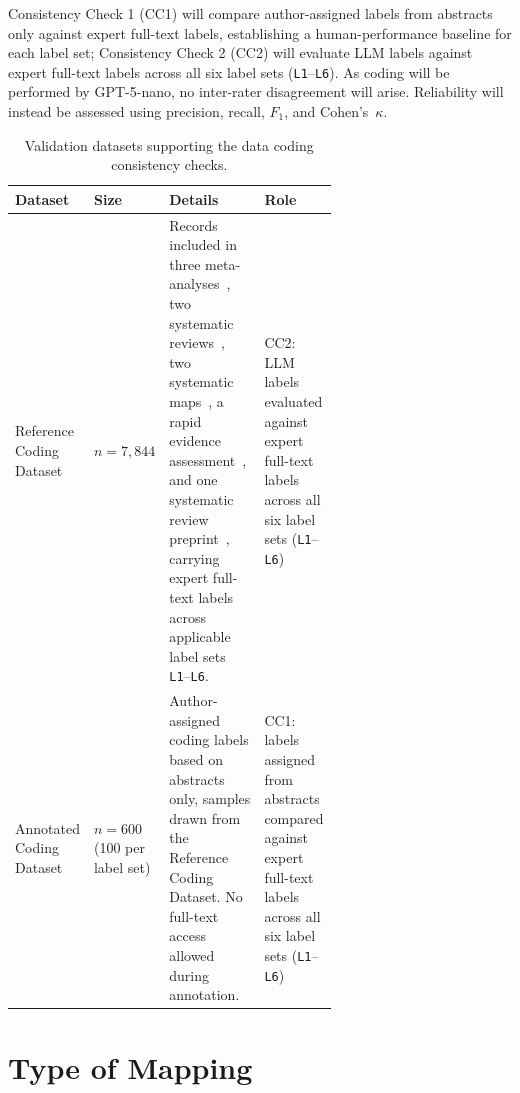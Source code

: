 \documentclass[12pt]{article}
\renewcommand{\arraystretch}{1.2}
\begin{document}
Consistency Check 1 (CC1) will compare author-assigned labels from abstracts only against expert full-text labels, establishing a human-performance baseline for each label set; Consistency Check 2 (CC2) will evaluate LLM labels against expert full-text labels across all six label sets (\texttt{L1}--\texttt{L6}). As coding will be performed by GPT-5-nano, no inter-rater disagreement will arise. Reliability will instead be assessed using precision, recall, $F_1$, and Cohen's~$\kappa$.

\begin{table}[H]
\renewcommand{\arraystretch}{1.3}
\setlength{\tabcolsep}{4pt}
\centering
\scriptsize
\begin{tabularx}{\linewidth}{|>{\raggedright\arraybackslash}p{0.22\linewidth}
                             |>{\raggedright\arraybackslash}p{0.12\linewidth}
                             |>{\raggedright\arraybackslash}p{0.30\linewidth}
                             |>{\raggedright\arraybackslash}X|}
\hline
\textbf{Dataset} & \textbf{Size} & \textbf{Details} & 
\textbf{Role} \\
\hline
Reference Coding Dataset & $n = 7{,}844$ & 
Records included in three meta-analyses~\cite{benitez-lopez_impact_2017, urban_accelerating_2015, kecketal}, two systematic reviews~\cite{Wrightetal, Lowryetal}, two systematic maps~\cite{moullec_identifying_2025_map, ridleyetal}, a rapid evidence assessment~\cite{jaureguiberry_direct_2022}, and one systematic review preprint~\cite{Pulidoetal}, carrying expert full-text labels across applicable label sets \texttt{L1}--\texttt{L6}. & 
CC2: LLM labels evaluated against expert full-text labels across all six label sets (\texttt{L1}--\texttt{L6}) \\
\hline
Annotated Coding Dataset & $n = 600$ (100 per label set) & 
Author-assigned coding labels based on abstracts only, samples drawn from the 
Reference Coding Dataset. No full-text access allowed during annotation. & 
CC1: labels assigned from abstracts compared against expert full-text labels across all six label sets (\texttt{L1}--\texttt{L6}) \\
\hline
\end{tabularx}
\caption{Validation datasets supporting the data coding consistency checks.}
\label{tab:dataset_overview_coding}
\end{table}
\section*{Type of Mapping}
\end{document}
